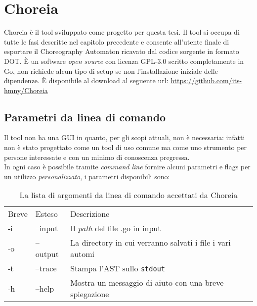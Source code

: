 \chapter{Choreia}
Choreia è il tool sviluppato come progetto per questa tesi. Il tool si occupa di tutte le fasi descritte nel capitolo precedente e consente all'utente finale di esportare il Choreography Automaton ricavato dal codice sorgente in formato DOT. È un software \emph{open source} con licenza GPL-3.0\cite{GPL-3.0} scritto completamente in Go, non richiede alcun tipo di setup se non l'installazione iniziale delle dipendenze. È disponibile al download al seguente url: \url{https://github.com/its-hmny/Choreia}\\

\section{Parametri da linea di comando}
Il tool non ha una GUI in quanto, per gli scopi attuali, non è necessaria: infatti non è stato progettato come un tool di uso comune ma come uno strumento per persone interessate e con un minimo di conoscenza pregressa.\\
In ogni caso è possibile tramite \emph{command line} fornire alcuni parametri e flags per un utilizzo \emph{personalizzato}, i parametri disponibili sono:
\begin{table}[h!]
    \centering
    \begin{tabular}{l l l}
        Breve & Esteso   & Descrizione                                               \\
        -i    & --input  & Il \emph{path} del file .go in input                      \\
        -o    & --output & La directory in cui verranno salvati i file i vari automi \\
        -t    & --trace  & Stampa l'AST sullo \texttt{stdout}                        \\
        -h    & --help   & Mostra un messaggio di aiuto con una breve spiegazione    \\
    \end{tabular}
    \caption{La lista di argomenti da linea di comando  accettati da Choreia}
\end{table}


